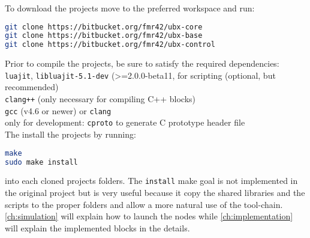 To download the projects move to the preferred workspace and run:
\begin{lstlisting}[language=bash]
git clone https://bitbucket.org/fmr42/ubx-core
git clone https://bitbucket.org/fmr42/ubx-base
git clone https://bitbucket.org/fmr42/ubx-control
\end{lstlisting}

Prior to compile the projects, be sure to satisfy the required dependencies:\\
\texttt{luajit}, \texttt{libluajit-5.1-dev} (>=2.0.0-beta11, for scripting (optional, but recommended)\\
\texttt{clang++} (only necessary for compiling C++ blocks)\\
\texttt{gcc} (v4.6 or newer) or \texttt{clang}\\
only for development: \texttt{cproto} to generate C prototype header file\\

The install the projects by running:
\begin{lstlisting}[language=bash]
make
sudo make install
\end{lstlisting}
into each cloned projects folders.
The \texttt{install} make goal is not implemented in the original project but is very useful because it copy the shared libraries and the scripts to the proper folders and allow a more natural use of the tool-chain.\\
\autoref{ch:simulation} will explain how to launch the nodes while \autoref{ch:implementation} will explain the implemented blocks in the details.


